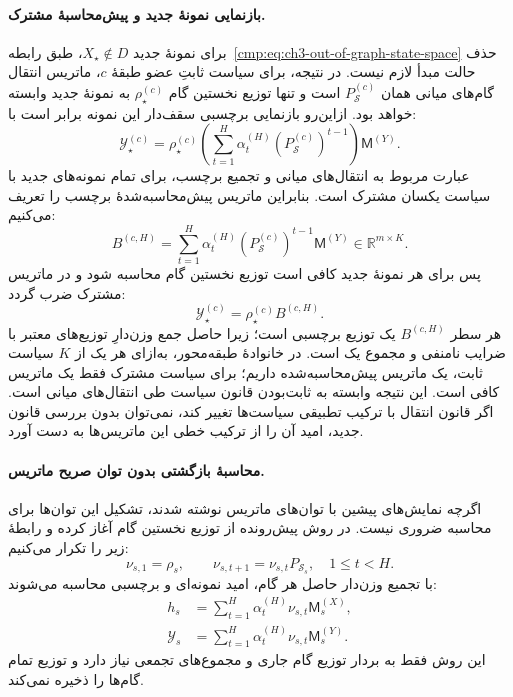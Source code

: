 \paragraph{بازنمایی نمونهٔ جدید و پیش‌محاسبهٔ مشترک.}
برای نمونهٔ جدید $X_\star\notin D$،
طبق رابطه~\eqref{cmp:eq:ch3-out-of-graph-state-space}
حذف حالت مبدأ لازم نیست. در نتیجه،
برای سیاست ثابتِ عضو طبقهٔ $c$،
ماتریس انتقال گام‌های میانی همان
$P_{\mathcal S}^{(c)}$ است و تنها
توزیع نخستین گام
$\rho_\star^{(c)}$ به نمونهٔ جدید وابسته
خواهد بود. ازاین‌رو بازنمایی برچسبی
سقف‌دار این نمونه برابر است با:
\[
\mathscr Y_\star^{(c)}
=\rho_\star^{(c)}
\left(\sum_{t=1}^{H}\alpha_t^{(H)}
(P_{\mathcal S}^{(c)})^{t-1}\right)\mathsf M^{(Y)}.
\]
عبارت مربوط به انتقال‌های میانی و
تجمیع برچسب، برای تمام نمونه‌های
جدید با سیاست یکسان مشترک است.
بنابراین ماتریس پیش‌محاسبه‌شدهٔ
برچسب را تعریف می‌کنیم:
\begin{equation}\label{cmp:eq:ch3-new-sample-precompute}
\boxed{
B^{(c,H)}
=\sum_{t=1}^{H}\alpha_t^{(H)}
(P_{\mathcal S}^{(c)})^{t-1}\mathsf M^{(Y)}
\in\mathbb R^{m\times K}.
}
\end{equation}
پس برای هر نمونهٔ جدید کافی است
توزیع نخستین گام محاسبه شود و در
ماتریس مشترک ضرب گردد:
\begin{equation}\label{cmp:eq:ch3-new-sample-representation}
\boxed{
\mathscr Y_\star^{(c)}
=\rho_\star^{(c)}B^{(c,H)}.
}
\end{equation}
هر سطر $B^{(c,H)}$ یک توزیع برچسبی
است؛ زیرا حاصل جمع وزن‌دارِ توزیع‌های
معتبر با ضرایب نامنفی و مجموع یک است.
در خانوادهٔ طبقه‌محور، به‌ازای هر
یک از $K$ سیاست ثابت، یک ماتریس
پیش‌محاسبه‌شده داریم؛ برای سیاست
مشترک فقط یک ماتریس کافی است.
این نتیجه وابسته به ثابت‌بودن
قانون سیاست طی انتقال‌های میانی است.
اگر قانون انتقال با ترکیب تطبیقی
سیاست‌ها تغییر کند، نمی‌توان
بدون بررسی قانون جدید، امید آن را
از ترکیب خطی این ماتریس‌ها به دست آورد.

\paragraph{محاسبهٔ بازگشتی بدون توان صریح ماتریس.}
اگرچه نمایش‌های پیشین با توان‌های
ماتریس نوشته شدند، تشکیل این توان‌ها
برای محاسبه ضروری نیست. در روش
پیش‌رونده از توزیع نخستین گام
آغاز کرده و رابطهٔ زیر را تکرار می‌کنیم:
\[
\boxed{
\nu_{s,1}=\rho_s,\qquad
\nu_{s,t+1}=\nu_{s,t}P_{\mathcal S_s},
\quad 1\le t<H.
}
\]
با تجمیع وزن‌دار حاصل هر گام،
امید نمونه‌ای و برچسبی محاسبه می‌شوند:
\begin{equation}\label{cmp:eq:ch3-matrix-forward-recursion}
\boxed{
\begin{aligned}
h_s&=\sum_{t=1}^{H}\alpha_t^{(H)}
\nu_{s,t}\mathsf M_s^{(X)},\\
\mathscr Y_s&=\sum_{t=1}^{H}\alpha_t^{(H)}
\nu_{s,t}\mathsf M_s^{(Y)}.
\end{aligned}
}
\end{equation}
این روش فقط به بردار توزیع گام جاری
و مجموع‌های تجمعی نیاز دارد و
توزیع تمام گام‌ها را ذخیره نمی‌کند.

